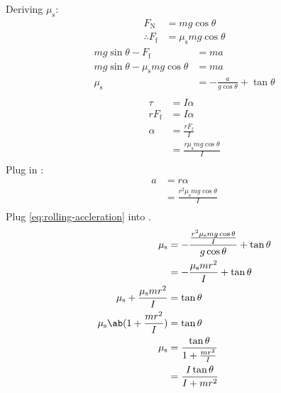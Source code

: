 Deriving \(\mu_\mathrm{s}\):
\begin{equation}
    \begin{aligned}
        F_\mathrm{N} &= m g \cos\theta \\
        \therefore F_\mathrm{f} &= \mu_\mathrm{s} m g \cos\theta
    \end{aligned}
\end{equation}
\begin{equation} \label{eq:rolling-static-friction}
    \begin{aligned}
        m g \sin\theta - F_\mathrm{f} &= m a \\
        m g \sin\theta - \mu_\mathrm{s} m g \cos\theta &= m a \\
        \mu_\mathrm{s} &= - \frac{a}{g \cos\theta} + \tan\theta \\
    \end{aligned}
\end{equation}
\begin{equation} \label{eq:rolling-angular-accleration}
    \begin{aligned}
        \tau &= I \alpha \\
        r F_\mathrm{f} &= I \alpha \\
        \alpha &= \frac{r F_\mathrm{f}}{I} \\
        &= \frac{r \mu_\mathrm{s} m g \cos\theta}{I} \\
    \end{aligned}
\end{equation}
Plug in :
\begin{equation}
    \begin{aligned} \label{eq:rolling-accleration}
        a &= r \alpha \\
        &= \frac{r^2 \mu_\mathrm{s} m g \cos\theta}{I} \\
    \end{aligned}
\end{equation}
Plug \cref{eq:rolling-accleration} into .
\begin{equation}
    \begin{aligned}
        \mu_\mathrm{s} &=
        - \frac{
            \frac{r^2 \mu_\mathrm{s} m g \cos\theta}{I}
        }
        {g \cos\theta}
        + \tan\theta \\
        &= - \frac{\mu_\mathrm{s} m r^2}{I} + \tan\theta \\
        \mu_\mathrm{s} + \frac{\mu_\mathrm{s} m r^2}{I} &= \tan\theta \\
        \mu_\mathrm{s} \ab(1 + \frac{m r^2}{I}) &= \tan\theta \\
        \mu_\mathrm{s} &= \frac{\tan\theta}{1 + \frac{m r^2}{I}} \\
        &= \frac{I \tan\theta}{I + m r^2}
    \end{aligned}
\end{equation}
